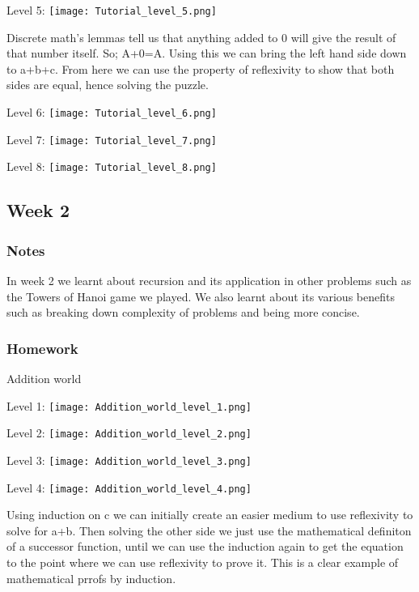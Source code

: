 \documentclass{article}
\theoremstyle{theorem}
\theoremstyle{definition}
\theoremstyle{remark}
\begin{document}
Level 5: 
\texttt{[image: Tutorial\_level\_5.png]}

Discrete math's lemmas tell us that anything added to 0 will give the result of that number itself. So; A+0=A. 
Using this we can bring the left hand side down to a+b+c. 
From here we can use the property of reflexivity to show that both sides are equal, hence solving the puzzle. 

Level 6:
\texttt{[image: Tutorial\_level\_6.png]}

Level 7:
\texttt{[image: Tutorial\_level\_7.png]}

Level 8:
\texttt{[image: Tutorial\_level\_8.png]}


\subsection{Week 2}

\subsubsection*{Notes}

In week 2 we learnt about recursion and its application in other problems such as the Towers of Hanoi game we played. We also learnt about its various benefits such as breaking down complexity of problems and being more concise.

\subsubsection*{Homework}

Addition world

Level 1: 
\texttt{[image: Addition\_world\_level\_1.png]}

Level 2: 
\texttt{[image: Addition\_world\_level\_2.png]}

Level 3:
\texttt{[image: Addition\_world\_level\_3.png]}

Level 4:
\texttt{[image: Addition\_world\_level\_4.png]}

Using induction on c we can initially create an easier medium to use reflexivity to solve for a+b. Then solving the other side we just use the mathematical definiton of a successor function, until we can use the induction again to get the equation to the point where we can use reflexivity to prove it. This is a clear example of mathematical prrofs by induction.
\end{document}
